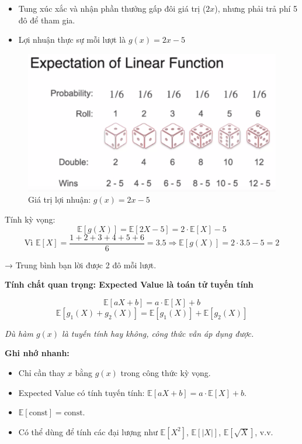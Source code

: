 \documentclass[11pt]{article}
\begin{document}
\begin{itemize}
    \item Tung xúc xắc và nhận phần thưởng gấp đôi giá trị ($2x$), nhưng phải trả phí 5 đô để tham gia.
    \item Lợi nhuận thực sự mỗi lượt là $g(x) = 2x - 5$
\end{itemize}

\begin{figure}[H]
    \centering
    \includegraphics[width=0.7\linewidth]{images/dice_game_net_reward.png}
    \caption{Giá trị lợi nhuận: $g(x) = 2x - 5$}
\end{figure}

Tính kỳ vọng:
\[
\mathbb{E}[g(X)] = \mathbb{E}[2X - 5] = 2 \cdot \mathbb{E}[X] - 5
\]
\[
\text{Vì } \mathbb{E}[X] = \frac{1 + 2 + 3 + 4 + 5 + 6}{6} = 3.5
\Rightarrow \mathbb{E}[g(X)] = 2 \cdot 3.5 - 5 = 2
\]

→ Trung bình bạn lời được 2 đô mỗi lượt.

\vspace{0.5em}

\textbf{Tính chất quan trọng: Expected Value là toán tử tuyến tính}

\[
\mathbb{E}[aX + b] = a \cdot \mathbb{E}[X] + b
\]
\[
\mathbb{E}[g_1(X) + g_2(X)] = \mathbb{E}[g_1(X)] + \mathbb{E}[g_2(X)]
\]

\textit{Dù hàm $g(x)$ là tuyến tính hay không, công thức vẫn áp dụng được.}

\vspace{1em}


\begin{summarybox}
	\textbf{Ghi nhớ nhanh:}
	\begin{itemize}
	    \item Chỉ cần thay $x$ bằng $g(x)$ trong công thức kỳ vọng.
	    \item Expected Value có tính tuyến tính: $\mathbb{E}[aX + b] = a \cdot \mathbb{E}[X] + b$.
	    \item $\mathbb{E}[\text{const}] = \text{const}$.
	    \item Có thể dùng để tính các đại lượng như $\mathbb{E}[X^2]$, $\mathbb{E}[|X|]$, $\mathbb{E}[\sqrt{X}]$, v.v.
	\end{itemize}
\end{summarybox}
\end{document}
